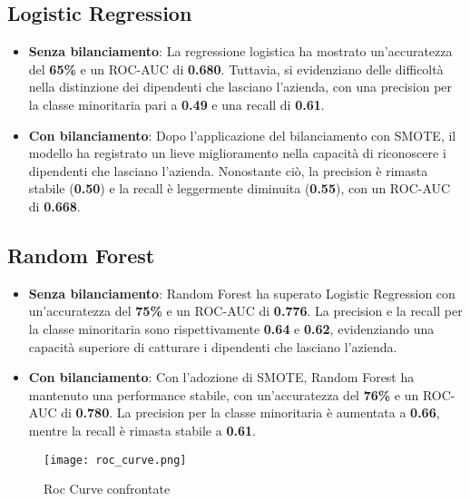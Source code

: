 \documentclass[a4paper,12pt]{article}
\begin{document}
\subsection{Logistic Regression}
\begin{itemize}
    \item \textbf{Senza bilanciamento}: La regressione logistica ha mostrato un'accuratezza del \textbf{65\%} e un ROC-AUC di \textbf{0.680}. Tuttavia, si evidenziano delle difficoltà nella distinzione dei dipendenti che lasciano l'azienda, con una precision per la classe minoritaria pari a \textbf{0.49} e una recall di \textbf{0.61}.
    \item \textbf{Con bilanciamento}: Dopo l'applicazione del bilanciamento con SMOTE, il modello ha registrato un lieve miglioramento nella capacità di riconoscere i dipendenti che lasciano l'azienda. Nonostante ciò, la precision è rimasta stabile (\textbf{0.50}) e la recall è leggermente diminuita (\textbf{0.55}), con un ROC-AUC di \textbf{0.668}.
\end{itemize}



\subsection{Random Forest}
\begin{itemize}
    \item \textbf{Senza bilanciamento}: Random Forest ha superato Logistic Regression con un'accuratezza del \textbf{75\%} e un ROC-AUC di \textbf{0.776}. La precision e la recall per la classe minoritaria sono rispettivamente \textbf{0.64} e \textbf{0.62}, evidenziando una capacità superiore di catturare i dipendenti che lasciano l'azienda.
    \item \textbf{Con bilanciamento}: Con l'adozione di SMOTE, Random Forest ha mantenuto una performance stabile, con un'accuratezza del \textbf{76\%} e un ROC-AUC di \textbf{0.780}. La precision per la classe minoritaria è aumentata a \textbf{0.66}, mentre la recall è rimasta stabile a \textbf{0.61}.
\end{itemize}

\begin{figure}[H]
    \centering
    \texttt{[image: roc\_curve.png]}
    \caption{Roc Curve confrontate}
    \label{fig:confusion_rf}
\end{figure}
\end{document}
